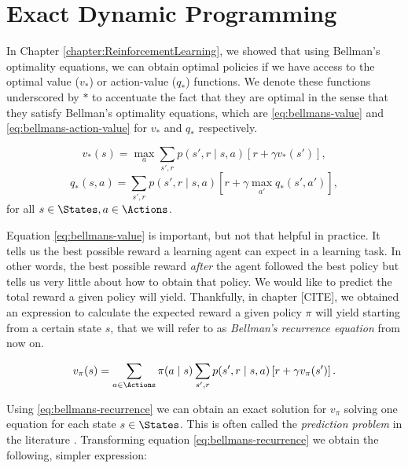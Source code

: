 \section{Exact Dynamic Programming}
In Chapter \ref{chapter:ReinforcementLearning}, we showed that using Bellman's
optimality equations, we can obtain optimal policies if we have access to the
optimal value ($v_*$) or action-value ($q_{*}$) functions. We denote these
functions underscored by $*$ to accentuate the fact that they are optimal in the
sense that they satisfy Bellman's optimality equations, which are
\eqref{eq:bellmans-value} and \eqref{eq:bellmans-action-value} for $v_*$ and
$q_*$ respectively. 


\begin{equation}
\label{eq:bellmans-value}
v_{*}(s) = \max_{a} \sum_{s', r} p(s', r \mid s, a) \left[ r + \gamma v_{*} (s')
\right],
\end{equation}
\begin{equation}
\label{eq:bellmans-action-value}
q_{*}(s, a) = \sum_{s', r} p(s', r \mid s, a) \left[ r + \gamma \max_{a'} q_{*}
(s', a') \right],
\end{equation}
for all $s \in \States, a \in \Actions$.

Equation \eqref{eq:bellmans-value} is important, but not that helpful in
practice. It tells us the best possible reward a learning agent can expect in a
learning task. In other words, the best possible reward \textit{after} the agent
followed the best policy but tells us very little about how to obtain that
policy. We would like to predict the total reward a given policy will
yield. Thankfully, in chapter [CITE], we obtained an expression to calculate the
expected reward a given policy $\pi$ will yield starting from a certain state
$s$, that we will refer to as \textit{Bellman's recurrence equation} from now
on. 

\begin{equation}
\label{eq:bellmans-recurrence}
v_\pi (s) = \sum_{a \in \Actions} \pi(a \mid s) \sum_{s', r} p(s', r \mid s, a) \left[ r + \gamma v_{\pi}(s') \right].
\end{equation}

Using \eqref{eq:bellmans-recurrence} we can obtain an exact solution for $v_\pi$
solving one equation for each state $s \in \States$. This is often called the
\textit{prediction problem} in the literature \cite[Chapter~4.1]{SuttonBarto}.
Transforming equation \eqref{eq:bellmans-recurrence} we obtain the following,
simpler expression:


